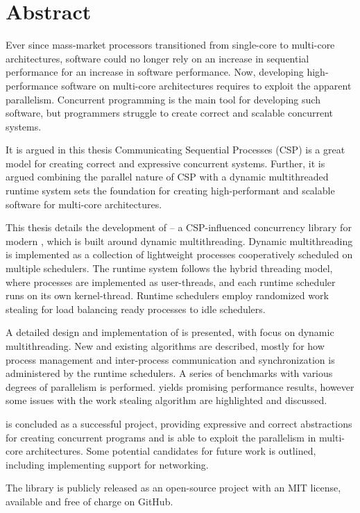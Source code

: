 
\newpage
{}
\section*{Abstract}


Ever since mass\hyp{}market processors transitioned from single\hyp{}core to multi\hyp{}core architectures, software could no longer rely on an increase in sequential performance for an increase in software performance. Now, developing high\hyp{}performance software on multi\hyp{}core architectures requires to exploit the apparent parallelism. Concurrent programming is the main tool for developing such software, but programmers struggle to create correct and scalable concurrent systems.

It is argued in this thesis Communicating Sequential Processes (CSP) is a great model for creating correct and expressive concurrent systems. Further, it is argued combining the parallel nature of CSP with a dynamic multithreaded runtime system sets the foundation for creating high\hyp{}performant and scalable software for multi\hyp{}core architectures.

This thesis details the development of \Proxc{} -- a CSP\hyp{}influenced concurrency library for modern \Cpp{}, which is built around dynamic multithreading. Dynamic multithreading is implemented as a collection of lightweight processes cooperatively scheduled on multiple schedulers. The runtime system follows the hybrid threading model, where processes are implemented as user\hyp{}threads, and each runtime scheduler runs on its own kernel\hyp{}thread. Runtime schedulers employ randomized work stealing for load balancing ready processes to idle schedulers.

A detailed design and implementation of \Proxc{} is presented, with focus on dynamic multithreading. New and existing algorithms are described, mostly for how process management and inter\hyp{}process communication and synchronization is administered by the runtime schedulers. A series of benchmarks with various degrees of parallelism is performed. \Proxc{} yields promising performance results, however some issues with the work stealing algorithm are highlighted and discussed.

\Proxc{} is concluded as a successful project, providing expressive and correct abstractions for creating concurrent programs and is able to exploit the parallelism in multi\hyp{}core architectures. Some potential candidates for future work is outlined, including implementing support for networking.

The \Proxc{} library is publicly released as an open\hyp{}source project with an MIT license, available and free of charge on GitHub.

\vfill

\afterpage{\blankpage}
